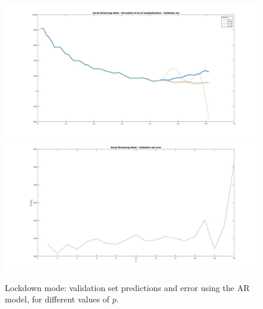 \documentclass[11pt]{article}
\begin{document}
\begin{figure}[h!]
	\centering
	\includegraphics[scale=0.3]{SD_val.jpg}
	\includegraphics[scale=0.3]{SD_Err_Val.jpg}
	\caption{Lockdown mode: validation set predictions and error using the AR model, for different values of \(p\).}
	\label{fig:SD_val}
\end{figure}
\end{document}
